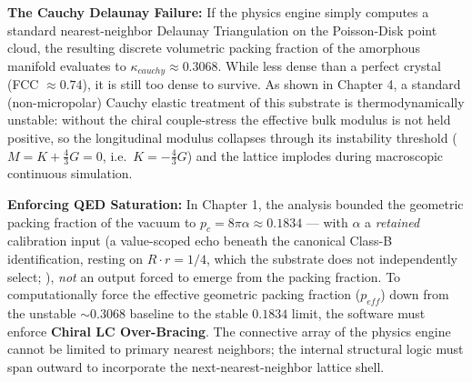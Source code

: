 \textbf{The Cauchy Delaunay Failure:} If the physics engine simply computes a standard nearest-neighbor Delaunay Triangulation on the Poisson-Disk point cloud, the resulting discrete volumetric packing fraction of the amorphous manifold evaluates to $\kappa_{cauchy} \approx 0.3068$. While less dense than a perfect crystal (FCC $\approx 0.74$), it is still too dense to survive. As shown in Chapter 4, a standard (non-micropolar) Cauchy elastic treatment of this substrate is thermodynamically unstable: without the chiral couple-stress the effective bulk modulus is not held positive, so the longitudinal modulus collapses through its instability threshold ($M = K + \frac{4}{3}G = 0$, i.e.\ $K = -\frac{4}{3}G$) and the lattice implodes during macroscopic continuous simulation.

\textbf{Enforcing QED Saturation:} In Chapter 1, the analysis bounded the geometric packing fraction of the vacuum to $p_{c} = 8\pi\alpha \approx \mathbf{0.1834}$ --- with $\alpha$ a \emph{retained} calibration input (a value-scoped echo beneath the canonical Class-B identification, resting on $R\cdot r = 1/4$, which the substrate does not independently select; ), \emph{not} an output forced to emerge from the packing fraction. To computationally force the effective geometric packing fraction ($p_{eff}$) down from the unstable $\sim 0.3068$ baseline to the stable $0.1834$ limit, the software must enforce \textbf{Chiral LC Over-Bracing}. The connective array of the physics engine cannot be limited to primary nearest neighbors; the internal structural logic must span outward to incorporate the next-nearest-neighbor lattice shell.

